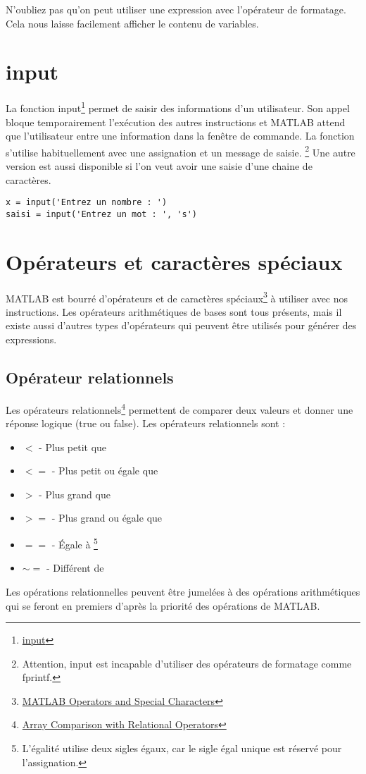 \documentclass{tufte-handout}
\begin{document}
N'oubliez pas qu'on peut utiliser une expression avec l'opérateur de formatage. Cela nous laisse facilement afficher le contenu de variables.

\section{input}
La fonction input\footnote{\href{https://www.mathworks.com/help/matlab/ref/input.html}{input}} permet de saisir des informations d'un utilisateur. Son appel bloque temporairement l'exécution des autres instructions et MATLAB attend que l'utilisateur entre une information dans la fenêtre de commande.
La fonction s'utilise habituellement avec une assignation et un message de saisie.
\footnote{Attention, input est incapable d'utiliser des opérateurs de formatage comme fprintf.}
Une autre version est aussi disponible si l'on veut avoir une saisie d'une chaine de caractères.
\begin{lstlisting}[title={Exemples d'utilisations de la fonction input}]
x = input('Entrez un nombre : ')
saisi = input('Entrez un mot : ', 's')
\end{lstlisting}

\section{Opérateurs et caractères spéciaux}
MATLAB est bourré d'opérateurs et de caractères spéciaux\footnote{\href{https://www.mathworks.com/help/matlab/matlab_prog/matlab-operators-and-special-characters.html}{MATLAB Operators and Special Characters}} à utiliser avec nos instructions. Les opérateurs arithmétiques de bases sont tous présents, mais il existe aussi d'autres types d'opérateurs qui peuvent être utilisés pour générer des expressions.
\subsection{Opérateur relationnels}
Les opérateurs relationnels\footnote{\href{https://www.mathworks.com/help/matlab/matlab_prog/array-comparison-with-relational-operators.html}{Array Comparison with Relational Operators}} permettent de comparer deux valeurs et donner une réponse logique (true ou false). Les opérateurs relationnels sont :
\begin{itemize}
    \item $<$ - Plus petit que
    \item $<=$ - Plus petit ou égale que
    \item $>$ - Plus grand que
    \item $>=$ - Plus grand ou égale que
    \item $==$ - Égale à \footnote{L'égalité utilise deux sigles égaux, car le sigle égal unique est réservé pour l'assignation.}
    \item $\ensuremath{\sim}=$ - Différent de
\end{itemize}
Les opérations relationnelles peuvent être jumelées à des opérations arithmétiques qui se feront en premiers d'après la priorité des opérations de MATLAB.
\end{document}
